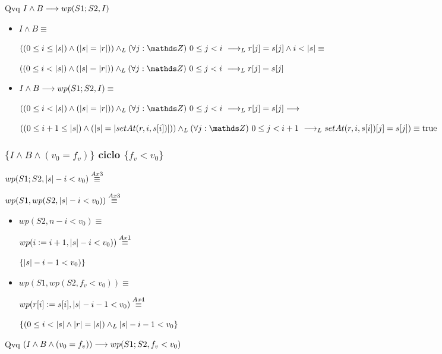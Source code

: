 \documentclass{article}
\begin{document}
Qvq $I \wedge B \longrightarrow wp(S1;S2, I)$

\begin{itemize}
    \item $I \wedge B \equiv$
    
    $ ((0 \leq i \leq \longitud{s}) \wedge (\longitud{s} = \longitud{r})) \yLuego \paraTodo{j}{0}{i} \implicaLuego r[j] = s[j] \wedge i < \longitud{s} \equiv$

    $ ((0 \leq i < \longitud{s}) \wedge (\longitud{s} = \longitud{r})) \yLuego \paraTodo{j}{0}{i} \implicaLuego r[j] = s[j] $

    \item $I \wedge B \longrightarrow wp(S1;S2, I) \equiv$

    $ ((0 \leq i < \longitud{s}) \wedge (\longitud{s} = \longitud{r})) \yLuego \paraTodo{j}{0}{i} \implicaLuego r[j] = s[j] \implica$

    $ ((0 \leq i+1 \leq \longitud{s}) \wedge (\longitud{s} = \longitud{setAt(r,i,s[i])})) \yLuego \paraTodo{j}{0}{i+1} \implicaLuego setAt(r,i,s[i])[j] = s[j]) \equiv \True$
\end{itemize}

\subsubsection*{$\{I \wedge B \wedge (v_{0} = f_{v})\}$ ciclo $\{f_{v} < v_{0}\}$}

$wp(S1;S2, |s|-i<v_{0}) \stackrel{Ax3}{\equiv}$

$wp(S1, wp(S2, |s|-i<v_{0})) \stackrel{Ax3}{\equiv}$

\begin{itemize}
    \item $wp(S2, n-i<v_{0}) \equiv$
    
    $ wp(i:= i+1, |s|-i<v_{0})) \stackrel{Ax1}{\equiv}$

    $\{|s|-i-1<v_{0}) \}$

    \item $wp(S1, wp(S2, f_{v} < v_{0})) \equiv$

    $wp(r[i]:= s[i], |s|-i-1<v_{0}) \stackrel{Ax4}{\equiv}$

    $\{ (0 \leq i < |s| \wedge |r| = |s|) \land _L |s|-i-1<v_{0} \} $

\end{itemize}

Qvq $(I \wedge B \wedge (v_{0} = f_{v})) \longrightarrow wp(S1;S2, f_{v} < v_{0})$ \\
\end{document}
